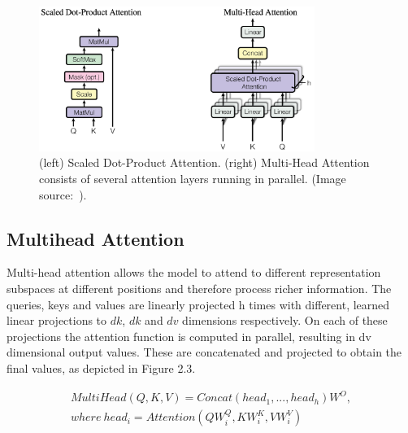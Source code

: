 \begin{figure}[!htbp]
	\centering
	\includegraphics[width = 0.8\textwidth]{figures/attention.png}
	\caption[Scaled Dot-Product Attention and Multi-Head Attention]
	{ (left) Scaled Dot-Product Attention. (right) Multi-Head Attention consists of several attention layers running in parallel. (Image source:~\cite{vaswani2017attention}).}
	\label{fig:attention}
\end{figure}

\subsection{Multihead Attention}

Multi-head attention allows the model to attend to different representation subspaces at different positions and therefore process richer information. The queries, keys and values are linearly projected h times with different, learned linear projections to $ dk $, $ dk $ and $ dv $ dimensions respectively. On each of these projections the attention function is computed in parallel, resulting in dv dimensional output values. These are concatenated and projected to obtain the final values, as depicted in Figure 2.3.

\begin{equation}
	\begin{aligned}
MultiHead(Q,K,V) = Concat(head_1,...,head_h)W^O, \\
where \ head_i = Attention(QW_i^Q,KW_i^K,VW_i^V)
\end{aligned}
\end{equation}


